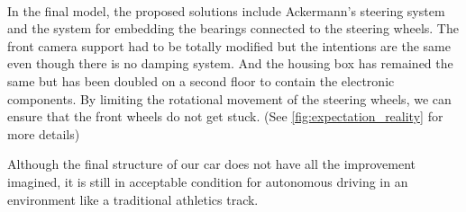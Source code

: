 \paragraph{}
In the final model, the proposed solutions include Ackermann's steering
system and the system for embedding the bearings connected to the steering
wheels. The front camera support had to be totally modified but the intentions
are the same even though there is no damping system. And the housing box has
remained the same but has been doubled on a second floor to contain the
electronic components.
By limiting the rotational movement of the steering wheels, we can ensure
that the front wheels do not get stuck.
(See \ref{fig:expectation_reality} for more details)

Although the final structure of our car does not have all the improvement
imagined, it is still in acceptable condition for autonomous driving in an
environment like a traditional athletics track.

